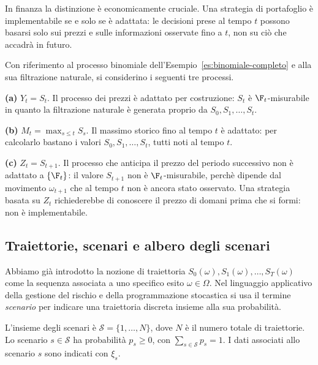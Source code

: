 In finanza la distinzione \`{e} economicamente cruciale. Una strategia
di portafoglio \`{e} implementabile se e solo se \`{e} adattata: le
decisioni prese al tempo $t$ possono basarsi solo sui prezzi e sulle
informazioni osservate fino a $t$, non su ci\`{o} che accadr\`{a}
in futuro.

\begin{example}
\label{es:adattato}
Con riferimento al processo binomiale dell'Esempio~\ref{es:binomiale-completo}
e alla sua filtrazione naturale, si considerino i seguenti tre processi.

\smallskip
\noindent
\textbf{(a)} $Y_t=S_t$. Il processo dei prezzi \`{e} adattato per
costruzione: $S_t$ \`{e} $\F_t$-misurabile in quanto la filtrazione
naturale \`{e} generata proprio da $S_0,S_1,\ldots,S_t$.

\smallskip
\noindent
\textbf{(b)} $M_t=\max_{s\leq t}S_s$. Il massimo storico fino al
tempo $t$ \`{e} adattato: per calcolarlo bastano i valori
$S_0,S_1,\ldots,S_t$, tutti noti al tempo $t$.

\smallskip
\noindent
\textbf{(c)} $Z_t=S_{t+1}$. Il processo che anticipa il prezzo del
periodo successivo non \`{e} adattato a $\{\F_t\}$: il valore
$S_{t+1}$ non \`{e} $\F_t$-misurabile, perch\`{e} dipende dal
movimento $\omega_{t+1}$ che al tempo $t$ non \`{e} ancora stato
osservato. Una strategia basata su $Z_t$ richiederebbe di conoscere
il prezzo di domani prima che si formi: non \`{e} implementabile.
\end{example}

\subsection{Traiettorie, scenari e albero degli scenari}

\noindent
Abbiamo gi\`{a} introdotto la nozione di traiettoria $S_0(\omega),S_1(\omega),\ldots,S_T(\omega)$  come la sequenza
associata a uno specifico
esito $\omega\in\Omega$. Nel linguaggio applicativo della gestione del
rischio e della programmazione stocastica si usa il termine
\emph{scenario} per indicare una traiettoria discreta insieme alla sua
probabilit\`{a}.

\begin{definition}
\label{def:scenari}
L'insieme degli scenari \`{e} $\mathcal{S}=\{1,\ldots,N\}$, dove $N$
\`{e} il numero totale di traiettorie. Lo scenario $s\in\mathcal{S}$
ha probabilit\`{a} $p_s\geq 0$, con $\sum_{s\in\mathcal{S}}p_s=1$.
I dati associati allo scenario $s$ sono indicati con $\xi_s$.
\end{definition}

